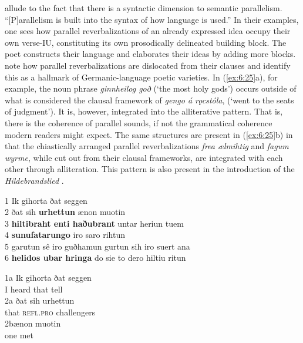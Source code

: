 \noindent \citet[207]{FrogTarkka2017} allude to the fact that there is a syntactic dimension to semantic parallelism. “[P]arallelism is built into the syntax of how language is used.” In their examples, one sees how parallel reverbalizations of an already expressed idea occupy their own verse-IU, constituting its own prosodically delineated building block. The poet constructs their language and elaborates their ideas by adding more blocks. \citet[207]{FrogTarkka2017} note how parallel reverbalizations are dislocated from their clauses and identify this as a hallmark of Germanic-language poetic varieties. In (\ref{ex:6:25}a), for example, the noun phrase \textit{ginnheilog goð} (‘the most holy gods’) occurs outside of what is considered the clausal framework of \textit{gengo á rǫcstóla}, (‘went to the seats of judgment’). It is, however, integrated into the alliterative pattern. That is, there is the coherence of parallel sounds, if not the grammatical coherence modern readers might expect. The same structures are present in (\ref{ex:6:25}b) in that the chiastically arranged parallel reverbalizations \textit{frea ælmihtig} and \textit{fagum wyrme}, while cut out from their clausal frameworks, are integrated with each other through alliteration. This pattern is also present in the introduction of the \textit{Hildebrandslied} .

\ea%
    \label{ex:6:26}
1 \tab Ik gihorta ðat seggen\\
2 \tab ðat sih \textbf{urhettun}  \qquad  ænon muotin\\
3 \tab \textbf{hiltibraht enti haðubrant}   \qquad       untar heriun tuem\\
4 \tab \textbf{sunufatarungo}  \qquad   iro saro rihtun\\
5 \tab garutun sê iro guðhamun  \qquad     gurtun sih iro suert ana\\
6 \tab \textbf{helidos ubar hringa} \qquad   do sie to dero hiltiu ritun\medskip

1a \tab \gll Ik  gihorta  ðat  seggen\\
              I  heard   that  tell\\

2a \tab \gll ðat     sih       urhettun\\
            that   \textsc{refl.pro}   challengers\\

2b\tab \gll ænon   muotin\\
            one     met\\

